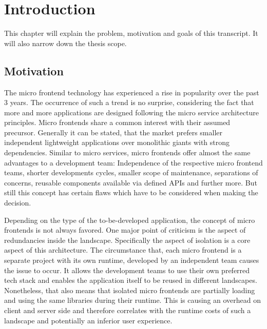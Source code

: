 \chapter{Introduction} %
\label{Chapter1}


This chapter will explain the problem, motivation and goals of this transcript. 
It will also narrow down the thesis scope.

\section{Motivation}

The micro frontend technology has experienced a rise in popularity over the past 3 years. The occurrence of such a trend is no surprise, considering the fact that more and more applications are designed following the micro service architecture principles.\cite{google_micro_frontend_trends} 
Micro frontends share a common interest with their assumed precursor. Generally it can be stated, that the market prefers smaller independent lightweight applications over monolithic giants with strong dependencies. Similar to micro services, micro frontends offer almost the same advantages to a development team: Independence of the respective micro frontend teams, shorter developments cycles, smaller scope of maintenance, separations of concerns, reusable components available via defined APIs and further more.\cite{advantages_of_mfes} But still this concept has certain flaws which have to be considered when making the decision.\cite{Yang_2019}

Depending on the type of the to-be-developed application, the concept of micro frontends is not always favored. One major point of criticism is the aspect of redundancies inside the landscape. Specifically the aspect of isolation is a core aspect of this architecture. The circumstance that, each micro frontend is a separate project with its own runtime, developed by an independent team causes the issue to occur. It allows the development teams to use their own preferred tech stack and enables the application itself to be reused in different landscapes. Nonetheless, that also means that isolated micro frontends are partially loading and using the same libraries during their runtime. This is causing an overhead on client and server side and therefore correlates with the runtime costs of such a landscape and potentially an inferior user experience.\cite{motivation_benefits_adopting_MFs}\cite{micro_frontends_in_general}

